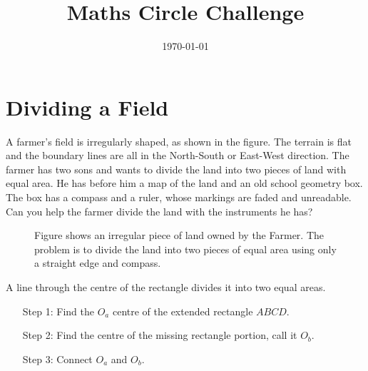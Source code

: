 \documentclass[12pt,answers]{exam}
\date{\today}
\begin{document}
\title{Maths Circle Challenge}
\maketitle
\thispagestyle{empty}
\section*{Dividing a Field}

\begin{questions}
\question A farmer's field is irregularly shaped, as shown in the figure. The terrain is flat and the boundary lines are all in the North-South or East-West direction. The farmer has two sons and wants to divide the land into two pieces of land with equal area. He has before him a map of the land and an old school geometry box. The box has a compass and a ruler, whose markings are faded and unreadable. Can you help the farmer divide the land with the instruments he has?
\begin{figure}[h]
    \centering
    \caption{Figure shows an irregular piece of land owned by the Farmer. The problem is to divide the land into two pieces of equal area using only a straight edge and compass.}
\end{figure}
\begin{solution}
    A line through the centre of the rectangle divides it into two equal areas.
    \begin{itemize}
        \item[Step 1:] Find the $O_a$ centre of the extended rectangle $ABCD$.
        \item[Step 2:] Find the centre of the missing rectangle portion, call it $O_b$.
        \item[Step 3:] Connect $O_a$ and $O_b$.
    \end{itemize}
\end{solution}
\end{questions}
\end{document}
